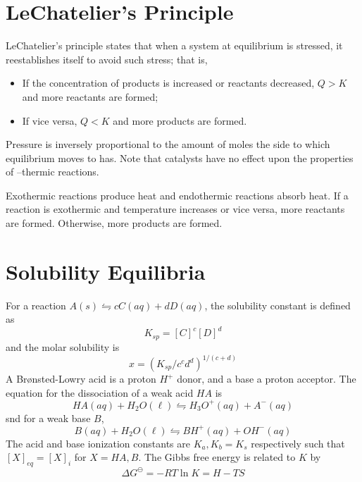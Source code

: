 \documentclass{tufte-book}
\begin{document}
\section{LeChatelier's Principle}

LeChatelier's principle states that when a system at equilibrium is stressed, it reestablishes itself to avoid such stress; that is,
\begin{itemize}
  \item If the concentration of products is increased or reactants decreased, $Q>K$ and more reactants are formed;
  \item If vice versa, $Q<K$ and more products are formed.
\end{itemize}
Pressure is inversely proportional to the amount of moles the side to which equilibrium moves to has. Note that catalysts have no effect upon the properties of --thermic reactions.

\bigskip
Exothermic reactions produce heat and endothermic reactions absorb heat. If a reaction is exothermic and temperature increases or vice versa, more reactants are formed. Otherwise, more products are formed.

\section{Solubility Equilibria}
For a reaction $A(s) \leftrightharpoons cC(aq) + dD(aq)$, the solubility constant is defined as \begin{equation}
  K_{sp} = [C]^c [D]^d
\end{equation}
and the molar solubility is \begin{equation}
  x = (K_{sp}/c^cd^d)^{1/(c+d)}
\end{equation}
A Brønsted-Lowry acid is a proton $H^+$ donor, and a base a proton acceptor. The equation for the dissociation of a weak acid $HA$ is \begin{equation}
  HA(aq) + H_2O (\ell) \leftrightharpoons H_3O^+ (aq) + A^- (aq)
\end{equation}
snd for a weak base $B$,
\begin{equation}
  B(aq) + H_2O (\ell) \leftrightharpoons BH^+ (aq) + OH^-(aq)
\end{equation}
The acid and base ionization constants are $K_a,K_b = K_s$ respectively such that $[X]_{eq} = [X]_i$ for $X = HA, B$. The Gibbs free energy is related to $K$ by \begin{equation}
\Delta G^\ominus = -RT \ln K = H-TS
\end{equation}
\end{document}
